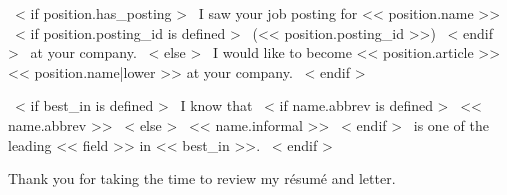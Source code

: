 ~< if position.has_posting >~
    I saw your job posting for << position.name >>
    ~< if position.posting_id is defined >~ (<< position.posting_id >>) ~< endif >~ at your company.
~< else >~
    I would like to become << position.article >> << position.name|lower >> at your company.
~< endif >~

~< if best_in is defined >~
    I know that
    ~< if name.abbrev is defined >~
        << name.abbrev >>
    ~< else >~
        << name.informal >>
    ~< endif >~
    is one of the leading << field >> in << best_in >>.
~< endif >~

Thank you for taking the time to review my résumé and letter.
